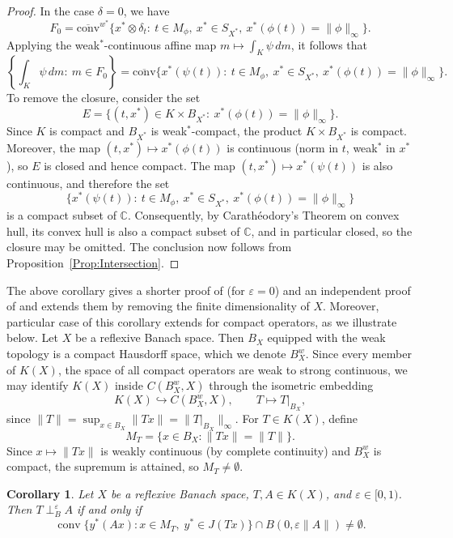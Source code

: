 \documentclass[11pt, reqno]{amsart}
\newtheorem{corollary}[theorem]{Corollary}
\theoremstyle{definition}
\newcommand{\zperp}{\perp_B^{\varepsilon}}
\begin{document}
\begin{proof}
In the case $\delta=0$, we have
\[
F_0=\overline{\mathrm{conv}}^{w^*}\{x^*\otimes \delta_t:\ t\in M_\phi,\ x^*\in S_{X^*},\ x^*(\phi(t))=\|\phi\|_\infty\}.
\]
Applying the weak$^*$-continuous affine map $m\mapsto \int_K \psi\,dm$, it follows that
\[
\left\{\int_K \psi\,dm:\ m\in F_0\right\}
=
\overline{\mathrm{conv}}\{x^*(\psi(t)):\ t\in M_\phi,\ x^*\in S_{X^*},\ x^*(\phi(t))=\|\phi\|_\infty\}.
\]
To remove the closure, consider the set
\[
E=\{(t,x^*)\in K\times B_{X^*}:\ x^*(\phi(t))=\|\phi\|_\infty\}.
\]
Since $K$ is compact and $B_{X^*}$ is weak$^*$-compact, the product $K\times B_{X^*}$ is compact. Moreover, the map $(t,x^*)\mapsto x^*(\phi(t))$ is continuous (norm in $t$, weak$^*$ in $x^*$), so $E$ is closed and hence compact. The map $(t,x^*)\mapsto x^*(\psi(t))$ is also continuous, and therefore the set
\[
\{x^*(\psi(t)):\ t\in M_\phi,\ x^*\in S_{X^*},\ x^*(\phi(t))=\|\phi\|_\infty\}
\]
is a compact subset of $\mathbb{C}$. Consequently, by Carath\'{e}odory's Theorem on convex hull, its convex hull is also a compact subset of $\mathbb{C}$, and in particular closed, so the closure may be omitted. The conclusion now follows from  Proposition~\ref{Prop:Intersection}.
\end{proof}
\noindent The above corollary gives a shorter proof of \cite[Theorem 3.2]{roy1} (for $\varepsilon=0$) and an independent proof of \cite[Theorem 4.4]{roy1} and extends them by removing the finite dimensionality of $X$. Moreover, particular case of this corollary extends \cite[Theorem 4.4]{roy1} for compact operators, as we illustrate below. Let $X$ be a reflexive Banach space. Then $B_X$ equipped with the weak topology is a compact Hausdorff space, which we denote $B_X^w$. Since every member of $K(X)$, the space of all compact operators are weak to strong continuous, we may identify $K(X)$ inside $C(B_X^w, X)$ through the isometric embedding
\[
K(X)\hookrightarrow C(B_X^w,X),\qquad T\mapsto T|_{B_X},
\]
since $\|T\|=\sup_{x\in B_X}\|Tx\|=\|T|_{B_X}\|_\infty$. For $T\in K(X)$, define
\[
M_T=\{x\in B_X:\|Tx\|=\|T\|\}.
\]
Since $x\mapsto \|Tx\|$ is weakly continuous (by complete continuity) and $B_X^w$ 
is compact, the supremum is attained, so $M_T\neq\emptyset$.

\begin{corollary}
Let $X$ be a reflexive Banach space, $T,A\in K(X)$, and $\varepsilon\in[0,1)$. 
Then $T\zperp A$ if and only if
\[
\operatorname{conv}\{y^*(Ax):x\in M_T,\;y^*\in J(Tx)\}
\cap B(0,\varepsilon\|A\|)\neq\emptyset.
\]
\end{corollary}
\end{document}
